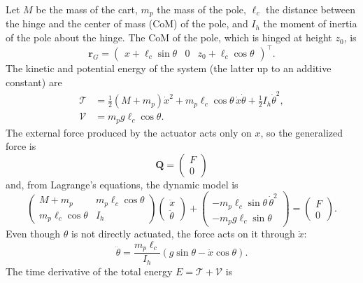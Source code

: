 \documentclass[10pt, a4paper]{report}
\begin{document}
\noindent Let $M$ be the mass of the cart, $m_p$ the mass of the pole, $\ell_c$ the distance between the hinge and the center of mass (CoM) of the pole, and $I_h$ the moment of inertia of the pole about the hinge. The CoM of the pole, which is hinged at height $z_0$, is
\begin{equation}
    \mathbf r_G=\begin{pmatrix}
        x+\ell_c\sin\theta & 0 & z_0+\ell_c\cos\theta
    \end{pmatrix}^\top.
\end{equation}
The kinetic and potential energy of the system (the latter up to an additive constant) are
\begin{align}
    \mathcal T &= \frac{1}{2}(M+m_p)\dot x^2+
    m_p\ell_c\cos\theta\,\dot x\dot\theta+\frac{1}{2}I_h\dot\theta^2,\\
    \mathcal V &= m_pg\ell_c\cos\theta.
\end{align}
The external force produced by the actuator acts only on $x$, so the generalized force is
\begin{equation}
    \mathbf Q = \begin{pmatrix}
        F\\ 0
    \end{pmatrix}
\end{equation}
and, from Lagrange's equations, the dynamic model is
\begin{equation}
    \begin{pmatrix}
        M+m_p&m_p\ell_c\cos\theta\\m_p\ell_c\cos\theta& I_h
    \end{pmatrix}\begin{pmatrix}
       \ddot x\\\ddot\theta
    \end{pmatrix}+\begin{pmatrix}
        -m_p\ell_c\sin\theta\,\dot\theta^2\\
        -m_pg\ell_c\sin\theta
    \end{pmatrix}= \begin{pmatrix}
        F\\ 0
    \end{pmatrix}.
\end{equation}
Even though $\theta$ is not directly actuated, the force acts on it through $\ddot x$:
\begin{equation}
    \ddot\theta=\frac{m_p\ell_c}{I_h}(g\sin\theta-\ddot x\cos\theta).
\end{equation}
The time derivative of the total energy $E=\mathcal T+\mathcal V$ is
\end{document}
